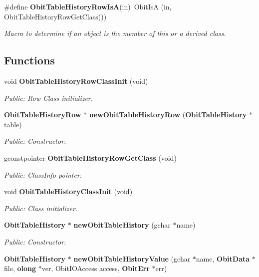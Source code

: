 \begin{CompactItemize}
\#define {\bf Obit\-Table\-History\-Row\-Is\-A}(in)\ Obit\-Is\-A (in, Obit\-Table\-History\-Row\-Get\-Class())
\begin{CompactList}\small\item\em Macro to determine if an object is the member of this or a derived class. \item\end{CompactList}\end{CompactItemize}
\subsection*{Functions}
\begin{CompactItemize}
\item 
void {\bf Obit\-Table\-History\-Row\-Class\-Init} (void)
\begin{CompactList}\small\item\em Public: Row Class initializer. \item\end{CompactList}\item 
{\bf Obit\-Table\-History\-Row} $\ast$ {\bf new\-Obit\-Table\-History\-Row} ({\bf Obit\-Table\-History} $\ast$table)
\begin{CompactList}\small\item\em Public: Constructor. \item\end{CompactList}\item 
gconstpointer {\bf Obit\-Table\-History\-Row\-Get\-Class} (void)
\begin{CompactList}\small\item\em Public: Class\-Info pointer. \item\end{CompactList}\item 
void {\bf Obit\-Table\-History\-Class\-Init} (void)
\begin{CompactList}\small\item\em Public: Class initializer. \item\end{CompactList}\item 
{\bf Obit\-Table\-History} $\ast$ {\bf new\-Obit\-Table\-History} (gchar $\ast$name)
\begin{CompactList}\small\item\em Public: Constructor. \item\end{CompactList}\item 
{\bf Obit\-Table\-History} $\ast$ {\bf new\-Obit\-Table\-History\-Value} (gchar $\ast$name, {\bf Obit\-Data} $\ast$file, {\bf olong} $\ast$ver, Obit\-IOAccess access, {\bf Obit\-Err} $\ast$err)

\end{CompactItemize}
